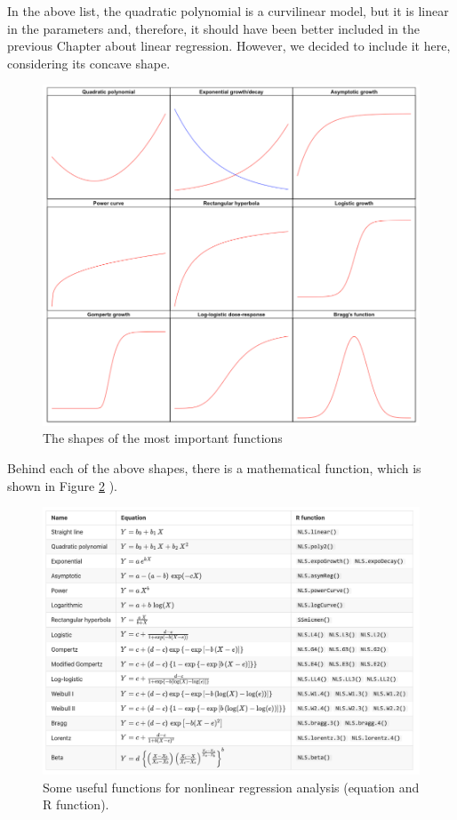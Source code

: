 \documentclass[a4paper,12pt,oneside]{book}
\begin{document}
In the above list, the quadratic polynomial is a curvilinear model, but it is linear in the parameters and, therefore, it should have been better included in the previous Chapter about linear regression. However, we decided to include it here, considering its concave shape.

\begin{figure}

{\centering \includegraphics[width=0.95\linewidth]{_images/nonLinearCurves} 

}

\caption{The shapes of the most important functions}\label{fig:figName151}
\end{figure}

Behind each of the above shapes, there is a mathematical function, which is shown in Figure \ref{fig:figName151bis} ).

\begin{figure}

{\centering \includegraphics[width=0.95\linewidth]{_images/nonLinearEquations} 

}

\caption{Some useful functions for nonlinear regression analysis (equation and R function).}\label{fig:figName151bis}
\end{figure}
\end{document}
